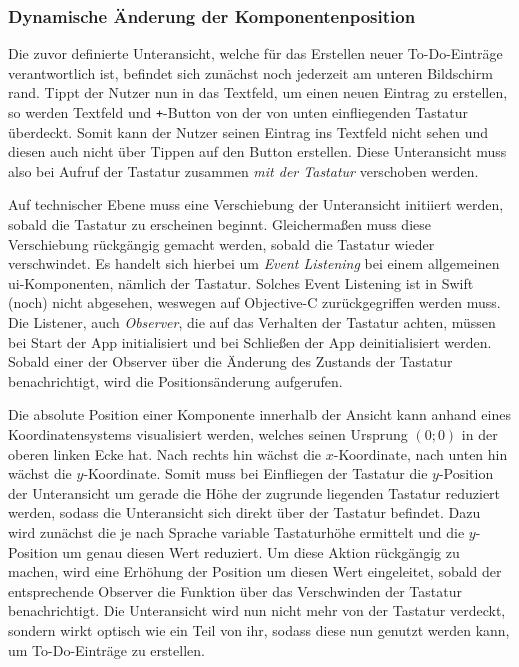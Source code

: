 \subsubsection{Dynamische Änderung der Komponentenposition}
Die zuvor definierte Unteransicht, welche für das Erstellen neuer To-Do-Einträge verantwortlich ist, befindet sich zunächst noch jederzeit am unteren Bildschirm rand. Tippt der Nutzer nun in das Textfeld, um einen neuen Eintrag zu erstellen, so werden Textfeld und \texttt{+}-Button von der von unten einfliegenden Tastatur überdeckt. Somit kann der Nutzer seinen Eintrag ins Textfeld nicht sehen und diesen auch nicht über Tippen auf den Button erstellen. Diese Unteransicht muss also bei Aufruf der Tastatur zusammen \textit{mit der Tastatur} verschoben werden.

Auf technischer Ebene muss eine Verschiebung der Unteransicht initiiert werden, sobald die Tastatur zu erscheinen beginnt. Gleichermaßen muss diese Verschiebung rückgängig gemacht werden, sobald die Tastatur wieder verschwindet. Es handelt sich hierbei um \textit{Event Listening} bei einem allgemeinen \ac{ui}-Komponenten, nämlich der Tastatur. Solches Event Listening ist in Swift (noch) nicht abgesehen, weswegen auf Objective-C zurückgegriffen werden muss. Die Listener, auch \textit{Observer}, die auf das Verhalten der Tastatur achten, müssen bei Start der App initialisiert und bei Schließen der App deinitialisiert werden. Sobald einer der Observer über die Änderung des Zustands der Tastatur benachrichtigt, wird die Positionsänderung aufgerufen.

Die absolute Position einer Komponente innerhalb der Ansicht kann anhand eines Koordinatensystems visualisiert werden, welches seinen Ursprung $(0; 0)$ in der oberen linken Ecke hat. Nach rechts hin wächst die $x$-Koordinate, nach unten hin wächst die $y$-Koordinate. Somit muss bei Einfliegen der Tastatur die $y$-Position der Unteransicht um gerade die Höhe der zugrunde liegenden Tastatur reduziert werden, sodass die Unteransicht sich direkt über der Tastatur befindet. Dazu wird zunächst die je nach Sprache variable Tastaturhöhe ermittelt und die $y$-Position um genau diesen Wert reduziert. Um diese Aktion rückgängig zu machen, wird eine Erhöhung der Position um diesen Wert eingeleitet, sobald der entsprechende Observer die Funktion über das Verschwinden der Tastatur benachrichtigt. Die Unteransicht wird nun nicht mehr von der Tastatur verdeckt, sondern wirkt optisch wie ein Teil von ihr, sodass diese nun genutzt werden kann, um To-Do-Einträge zu erstellen. \\\

